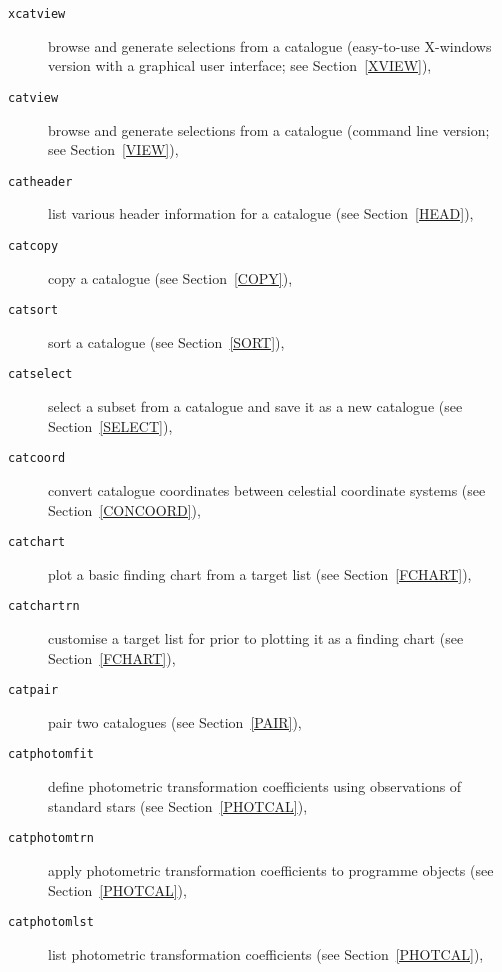\documentclass[twoside,11pt]{article}
\renewcommand{\_}{\texttt{\symbol{95}}}
\begin{document}
\begin{description}

  \item[ {\tt xcatview} ] browse and generate selections from a
   catalogue (easy-to-use X-windows version with a graphical user
   interface; see Section~\ref{XVIEW}),

  \item[ {\tt catview} ] browse and generate selections from a
   catalogue (command line version; see Section~\ref{VIEW}),

  \item[ {\tt catheader} ] list various header information for a catalogue
   (see Section~\ref{HEAD}),

  \item[ {\tt catcopy} ] copy a catalogue (see Section~\ref{COPY}),

  \item[ {\tt catsort} ] sort a catalogue (see Section~\ref{SORT}),

  \item[ {\tt catselect} ] select a subset from a catalogue and save it
   as a new catalogue (see Section~\ref{SELECT}),

  \item[ {\tt catcoord} ] convert catalogue coordinates between celestial
   coordinate systems (see Section~\ref{CONCOORD}),

  \item[ {\tt catchart} ] plot a basic finding chart from a target
   list (see Section~\ref{FCHART}),

  \item[ {\tt catchartrn} ] customise a target list for prior to
   plotting it as a finding chart (see Section~\ref{FCHART}),

  \item[ {\tt catpair} ] pair two catalogues (see Section~\ref{PAIR}),

  \item[ {\tt catphotomfit} ] define photometric transformation
   coefficients using observations of standard stars
   (see Section~\ref{PHOTCAL}),

  \item[ {\tt catphotomtrn} ] apply photometric transformation
   coefficients to programme objects (see Section~\ref{PHOTCAL}),

  \item[ {\tt catphotomlst} ] list photometric transformation
   coefficients (see Section~\ref{PHOTCAL}),


\end{description}
\end{document}
